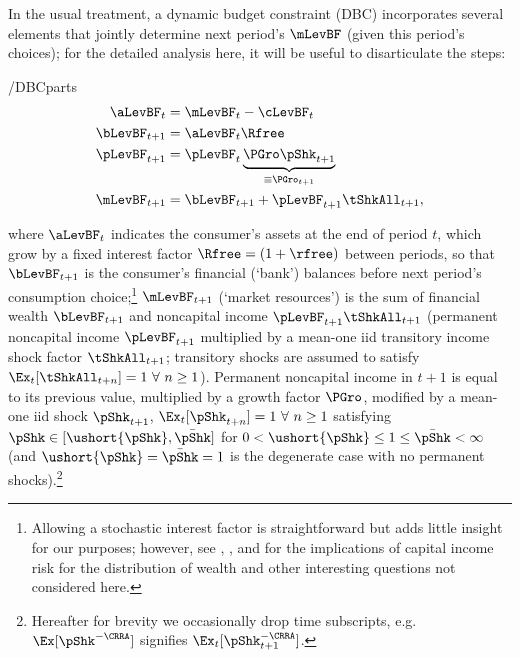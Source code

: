 \documentclass[BufferStockTheory]{subfiles}
\begin{document}
In the usual treatment, a dynamic budget constraint (DBC) incorporates
several elements that jointly determine next period's $\mLevBF$ (given this
period's choices); for the detailed analysis here, it will be useful to
disarticulate the steps:\hypertarget{DBCParts}{}
\begin{verbatimwrite}{\EqDir/DBCparts}
  \begin{align}
    \aLevBF_{t}    & = \mLevBF_{t}-\cLevBF_{t}  \label{eq:DBCparts} \\
    \bLevBF_{t+1}    & = \aLevBF_{t} \Rfree \notag \\
    \pLevBF_{t+1}  & = \pLevBF_{t} \underbrace{\PGro\pShk_{t+1}}_{\equiv \PGro_{t+1}}  \notag \\
    \mLevBF_{t+1}  & =  \bLevBF_{t+1} +\pLevBF_{t+1}\tShkAll_{t+1},  \notag
  \end{align}
\end{verbatimwrite}
 where $\aLevBF_{t}$ indicates the consumer's assets at the end of period $t$, which grow by a fixed interest factor $\Rfree =(1+\rfree)$ between periods,  so that $\bLevBF_{t+1}$ is the consumer's financial (`bank') balances before next period's consumption choice;\footnote{Allowing a stochastic interest factor is straightforward but adds little insight for our purposes; however, see \cite{benhabibWealth}, \cite{maTodaRich}, and \cite{mstIncFluct} for the implications of capital income risk for the distribution of wealth and other interesting questions not considered here.} $\mLevBF_{t+1}$ (`market resources') is the sum of financial wealth $\bLevBF_{t+1}$ and noncapital income $\pLevBF_{t+1}\tShkAll_{t+1}$ (permanent noncapital income $\pLevBF_{t+1}$ multiplied by a mean-one iid transitory income shock factor $\tShkAll_{t+1}$; transitory shocks are assumed to satisfy $\Ex_{t}[{\tShkAll}_{t+n}]=1~\forall~n\geq 1$). Permanent noncapital income in $t+1$ is equal to its previous value, multiplied by a growth factor $\PGro$, modified by a mean-one iid shock $\pShk_{t+1}$, $\Ex_{t}[{\pShk}_{t+n}]=1~\forall~n \geq 1$ satisfying $\pShk \in [\ushort{\pShk},\bar{\pShk}]$ for $0 < \ushort{\pShk} \leq 1 \leq \bar{\pShk} < \infty$ (and $\ushort{\pShk}=\bar{\pShk}=1$ is the degenerate case with no permanent shocks).\footnote{Hereafter for brevity we occasionally drop time subscripts, e.g.\ $\Ex[\pShk^{-\CRRA}]$ signifies $\Ex_{t}[\pShk_{t+1}^{-\CRRA}]$.}
\end{document}
